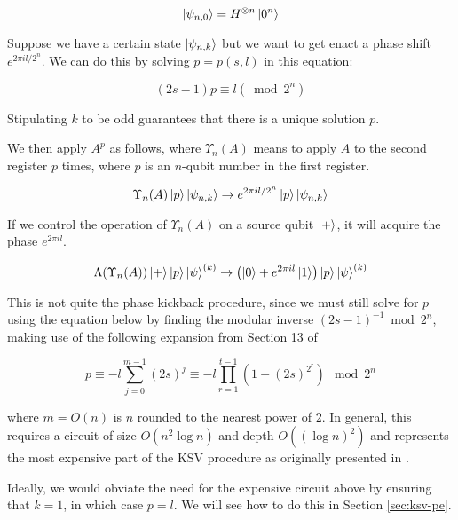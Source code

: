 \begin{displaymath}
\left\vert{\psi_{n,0}}\right\rangle = H^{\otimes n}\left\vert{0^n}\right\rangle
\end{displaymath}

Suppose we have a certain state $\left\vert{\psi_{n,k}}\right\rangle$ but we want to get enact
a phase shift $e^{2\pi i l / 2^n}$. We can do this by solving $p=p(s,l)$
in this equation:

\begin{equation}
\label{eqn:psl}
(2s-1)p \equiv l (\bmod 2^n)
\end{equation}

Stipulating $k$ to be odd guarantees that there is a unique solution $p$.

We then apply $A^p$ as follows, where $\Upsilon_n(A)$ means to
apply $A$ to the second register $p$ times, where $p$ is an $n$-qubit
number in the first register.

\begin{equation}
\label{eqn:upsilon}
\Upsilon_n(A) \left\vert{p}\right\rangle\left\vert{\psi_{n,k}}\right\rangle \rightarrow
e^{2\pi i l/2^n} \left\vert{p}\right\rangle\left\vert{\psi_{n,k}}\right\rangle
\end{equation}

If we control the operation of $\Upsilon_n(A)$ on a source qubit $\left\vert{+}\right\rangle$,
it will acquire the phase $e^{2\pi i l}$.

\begin{equation}
\Lambda(\Upsilon_n(A))\left\vert{+}\right\rangle\left\vert{p}\right\rangle\left\vert{\psi}\right\rangle^{(k)} \rightarrow
\left( \left\vert{0}\right\rangle + e^{2\pi i l}\left\vert{1}\right\rangle \right) \left\vert{p}\right\rangle\left\vert{\psi}\right\rangle^{(k)}
\end{equation}

This is not quite the phase kickback procedure, since
we must still solve for $p$ using the equation below by finding the
modular inverse $(2s - 1)^{-1} \bmod 2^n$,
making use of the following expansion from Section 13
of \cite{Kitaev2002}

\begin{equation}
p \equiv -l\sum_{j=0}^{m-1} (2s)^j \equiv -l \prod_{r=1}^{t-1}\left(1 + (2s)^{2^r}\right) \mod 2^n
\end{equation}

where $m = O(n)$ is $n$ rounded to the nearest power of $2$.  In general,
this requires a circuit of size $O(n^2 \log n)$ and depth $O((\log n)^2)$ and
represents the most expensive part of the KSV procedure as originally
presented in \cite{Kitaev2002}.

Ideally, we would obviate the need for the expensive circuit above
by ensuring that $k=1$, in which case
$p = l$. We will see how to do this in Section \ref{sec:ksv-pe}.

